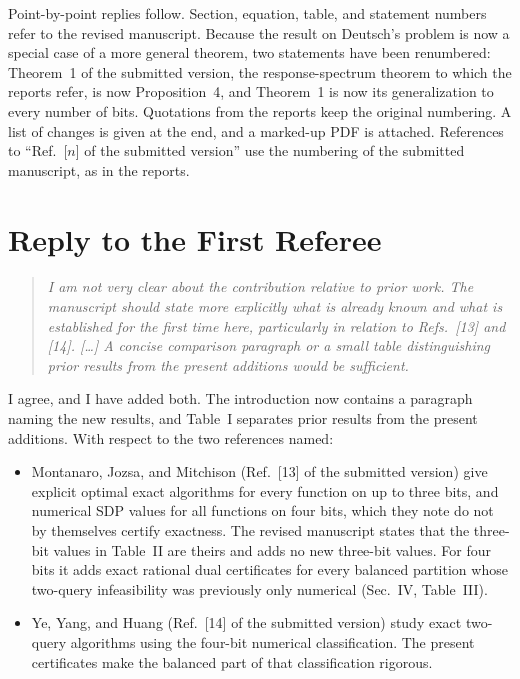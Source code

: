 \documentclass[11pt]{article}
\newenvironment{referee}{\begin{quote}\itshape}{\end{quote}}
\begin{document}
Point-by-point replies follow. Section, equation, table, and statement numbers
refer to the revised manuscript. Because the result on Deutsch's problem is now
a special case of a more general theorem, two statements have been renumbered:
Theorem~1 of the submitted version, the response-spectrum theorem to which the
reports refer, is now Proposition~4, and Theorem~1 is now its generalization
to every number of bits. Quotations from the reports keep the original
numbering. A list of changes is given at the end, and a
marked-up PDF is attached. References to ``Ref.~[$n$] of the submitted
version'' use the numbering of the submitted manuscript, as in the reports.

\section*{Reply to the First Referee}

\begin{referee}
I am not very clear about the contribution relative to prior work. The
manuscript should state more explicitly what is already known and what is
established for the first time here, particularly in relation to Refs.~[13]
and [14]. [\dots] A concise comparison paragraph or a small table
distinguishing prior results from the present additions would be sufficient.
\end{referee}

I agree, and I have added both. The introduction now contains a paragraph
naming the new results, and Table~I separates prior results from the present
additions. With respect to the two references named:

\begin{itemize}[leftmargin=*]
\item Montanaro, Jozsa, and Mitchison (Ref.~[13] of the submitted version)
give explicit optimal exact algorithms for every function on up to three
bits, and numerical SDP values for all functions on four bits, which they
note do not by themselves certify exactness. The revised manuscript states
that the three-bit values in Table~II are theirs and adds no new three-bit
values. For four bits it adds exact rational dual certificates for every
balanced partition whose two-query infeasibility was previously only
numerical (Sec.~IV, Table~III).
\item Ye, Yang, and Huang (Ref.~[14] of the submitted version) study exact
two-query algorithms using the four-bit numerical classification. The present
certificates make the balanced part of that classification rigorous.
\end{itemize}
\end{document}
